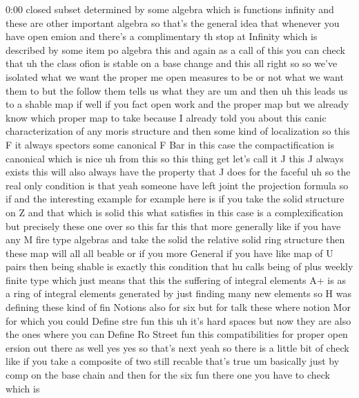 \begin{unfinished}{0:00}
closed  subset  determined  by  some  algebra
which  is  functions  infinity  and  these
are  other  important  algebra  so  that's
the  general  idea  that  whenever  you  have
open  emion  and  there's  a
complimentary  th  stop  at  Infinity  which
is  described  by  some  item  po  algebra
this  and  again  as  a  call  of  this  you  can
check
that
uh  the  class  ofion  is  stable  on  a  base
change
and
this
all  right
so  so  we've  isolated  what  we  want  the
proper  me  open  measures  to  be  or  not
what  we  want  them  to  but  the  follow  them
tells  us  what  they  are
um  and  then
uh  this  leads  us  to  a  shable
map
if  well  if  you  fact  open  work  and  the
proper  map  but  we  already  know  which
proper  map  to  take  because  I  already
told  you  about  this  canic
characterization  of  any
moris  structure  and  then  some  kind  of
localization  so  this  F  it  always
spectors  some  canonical  F
Bar  in  this  case  the  compactification  is
canonical  which  is  nice  uh  from
this  so
this
thing  get  let's  call  it
J  this  J  always  exists  this  will  also
always  have  the  property  that  J  does  for
the  faceful  uh  so  the  real  only
condition  is  that  yeah  someone  have  left
joint  the  projection  formula  so
if
and  the  interesting  example  for  example
here
is  if  you  take  the  solid  structure  on  Z
and  that  which
is
solid  this  what  satisfies  in  this  case
is  a  complexification  but  precisely
these  one
over  so  this  far  this
that  more  generally  like  if  you  have  any
M  fire
type  algebras  and  take  the
solid  the  relative  solid  ring  structure
then  these  map  will  all  all
beable  or  if  you  more  General  if  you
have  like  map  of  U
pairs  then  being  shable  is  exactly  this
condition  that  hu  calls  being  of  plus
weekly  finite  type  which  just  means  that
this  the  suffering  of  integral  elements
A+  is  as  a  ring  of  integral  elements
generated  by  just  finding  many  new
elements
so  H  was  defining  these  kind  of  fin
Notions  also  for  six  but  for  talk  these
where
notion  Mor  for  which  you  could  Define
stre  fun  this  uh  it's  hard
spaces  but  now  they  are  also  the  ones
where  you  can  Define  Ro  Street
fun  this  compatibilities  for  proper  open
ersion  out  there  as  well
yes  yes  so  that's  next  yeah  so  there  is
a  little  bit  of  check  like  if  you  take  a
composite  of  two  still  recable  that's
true  um  basically  just  by  comp  on  the
base  chain  and  then  for  the  six  fun
there  one  you  have  to  check  which  is

\end{unfinished}
